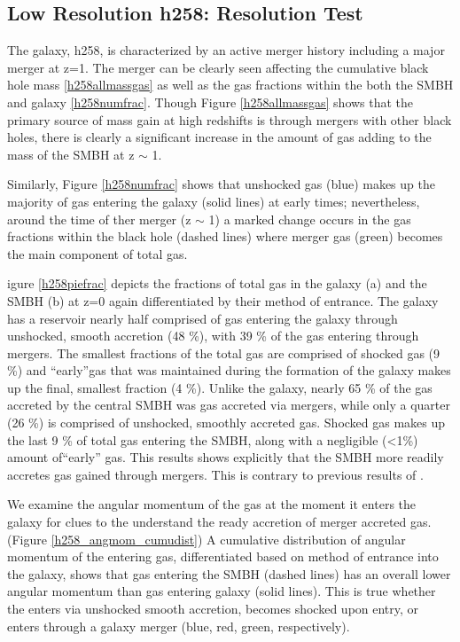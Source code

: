 \documentclass[manuscript]{aastex}
\begin{document}
\subsection{Low Resolution h258: Resolution Test}
	
The galaxy, h258, is characterized by an active merger history including a major merger at z=1. The merger can be clearly seen affecting the cumulative black hole mass \ref{h258allmassgas} as well as the gas fractions within the both the SMBH and galaxy \ref{h258numfrac}. 
Though Figure \ref{h258allmassgas} shows that the primary source of mass gain at high redshifts is through mergers with other black holes, there is clearly a significant increase in the amount of gas adding to the mass of the SMBH at z $\sim$ 1. 

Similarly, Figure \ref{h258numfrac} shows that unshocked gas (blue) makes up the majority of gas entering the galaxy (solid lines) at early times; nevertheless, around the time of ther merger (z $\sim$ 1) a marked change occurs in the gas fractions within the black hole (dashed lines) where merger gas (green) becomes the main component of total gas. 

igure \ref{h258piefrac} depicts the fractions of total gas in the galaxy (a) and the SMBH (b) at z=0 again differentiated by their method of entrance. The galaxy has a reservoir nearly half comprised of gas entering the galaxy through unshocked, smooth accretion (48 \%), with 39 \% of the gas entering through mergers. The smallest fractions of the total gas are comprised of shocked gas (9 \%) and ``early''gas that was maintained during the formation of the galaxy makes up the final, smallest fraction (4 \%). Unlike the galaxy, nearly 65 \% of the gas accreted by the central SMBH was gas accreted via mergers, while only a quarter (26 \%) is comprised of unshocked, smoothly accreted gas. Shocked gas makes up the last 9 \% of total gas entering the SMBH, along with a negligible (<1\%) amount of``early'' gas. This results shows explicitly that the SMBH more readily accretes gas gained through mergers. This is contrary to previous results of \cite{Bellovary2013}.

We examine the angular momentum of the gas at the moment it enters the galaxy for clues to the understand the ready accretion of merger accreted gas. (Figure \ref{h258_angmom_cumudist}) A cumulative distribution of angular momentum of the entering gas, differentiated based on method of entrance into the galaxy, shows that gas entering the SMBH (dashed lines) has an overall lower angular momentum than gas entering galaxy (solid lines). This is true whether the enters via unshocked smooth accretion, becomes shocked upon entry, or enters through a galaxy merger (blue, red, green, respectively).
\end{document}
